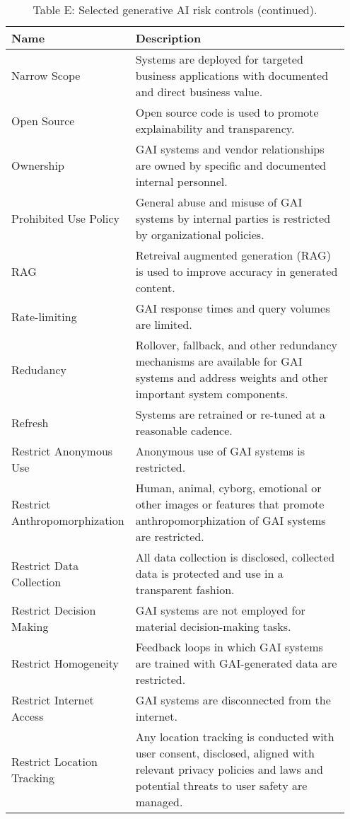 \documentclass[fleqn]{article}
\begin{document}
\begin{table}[H]
	\caption*{Table E: Selected generative AI risk controls (continued).}
	\label{tab:controls_cont2}
	\footnotesize
	\begin{tabular}{|m{0.25\linewidth} |m{0.70\linewidth} |}
		\hline
		\textbf{Name} & \textbf{Description} \\
		\hline		
		Narrow Scope & Systems are deployed for targeted business applications with documented and direct business value. \\ \hline
		Open Source & Open source code is used to promote explainability and transparency.  \\ \hline
		Ownership & GAI systems and vendor relationships are owned by specific and documented internal personnel. \\ \hline
		Prohibited Use Policy & General abuse and misuse of GAI systems by internal parties is restricted by organizational policies. \\ \hline
		RAG & Retreival augmented generation (RAG) is used to improve accuracy in generated content.  \\ \hline
		Rate-limiting  & GAI response times and query volumes are limited.  \\ \hline
		Redudancy & Rollover, fallback, and other redundancy mechanisms are available for GAI systems and address weights and other important system components.   \\ \hline
		Refresh & Systems are retrained or re-tuned at a reasonable cadence.  \\ \hline
		Restrict Anonymous Use & Anonymous use of GAI systems is restricted.  \\ \hline
		Restrict Anthropomorphization  & Human, animal, cyborg, emotional or other images or features that promote anthropomorphization of GAI systems are restricted.   \\ \hline
		Restrict Data Collection & All data collection is disclosed, collected data is protected and use in a transparent fashion. \\ \hline		
		Restrict Decision Making  & GAI systems are not employed for material decision-making tasks.  \\ \hline		
		Restrict Homogeneity & Feedback loops in which GAI systems are trained with GAI-generated data are restricted. \\ \hline
		Restrict Internet Access & GAI systems are disconnected from the internet.  \\ \hline		
		Restrict Location Tracking & Any location tracking is conducted with user consent, disclosed, aligned with relevant privacy policies and laws and potential threats to user safety are managed.   \\ \hline		

\end{tabular}
\end{table}
\end{document}
